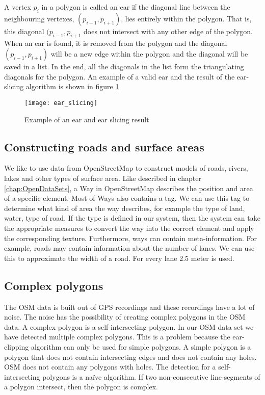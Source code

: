 A vertex $p_i$ in a polygon is called an ear if the diagonal line between the neighbouring vertexes, $(p_{i-1}, p_{i+1})$, lies entirely within the polygon. That is, this diagonal $(p_{i-1}, p_{i+1}$ does not intersect with any other edge of the polygon. When an ear is found, it is removed from the polygon and the diagonal $(p_{i-1}, p_{i+1})$ will be a new edge within the polygon and the diagonal will be saved in a list. In the end, all the diagonals in the list form the triangulating diagonals for the polygon. An example of a valid ear and the result of the ear-slicing algorithm is shown in figure \ref{fig:ear_slicing}
\begin{figure}[htb!]
    \centering
    \texttt{[image: ear\_slicing]}
    \caption{Example of an ear and ear slicing result}
    \label{fig:ear_slicing}
\end{figure}

\subsection{Constructing roads and surface areas}
We like to use data from OpenStreetMap to construct models of roads, rivers, lakes and other types of surface area. Like described in chapter \ref{chap:OpenDataSets}, a Way in OpenStreetMap describes the position and area of a specific element. Most of Ways also contains a tag. We can use this tag to determine what kind of area the way describes, for example the type of land, water, type of road. If the type is defined in our system, then the system can take the appropriate measures to convert the way into the correct element and apply the corresponding texture. Furthermore, ways can contain meta-information. For example, roads may contain information about the number of lanes. We can use this to approximate the width of a road. For every lane 2.5 meter is used.

\subsection{Complex polygons}
\label{subsec:ComplexPolygons}
The OSM data is built out of GPS recordings and these recordings have a lot of noise. The noise has the possibility of creating complex polygons in the OSM data. A complex polygon is a self-intersecting polygon. In our OSM data set we have detected multiple complex polygons. This is a problem because the ear-clipping algorithm can only be used for simple polygons. A simple polygon is a polygon that does not contain intersecting edges and does not contain any holes. OSM does not contain any polygons with holes. The detection for a self-intersecting polygons is a naïve algorithm. If two non-consecutive line-segments of a polygon intersect, then the polygon is complex.

